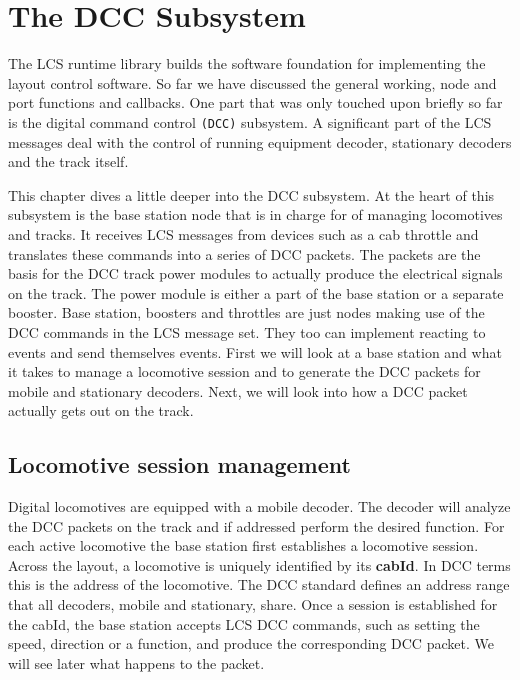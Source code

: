\chapter{The DCC Subsystem}

The LCS runtime library builds the software foundation for implementing the layout control software. So far we have discussed the general working, node and port functions and callbacks. One part that was only touched upon briefly so far is the digital command control \texttt{(DCC)} subsystem. A significant part of the LCS messages deal with the control of running equipment decoder, stationary decoders and the track itself.

This chapter dives a little deeper into the DCC subsystem. At the heart of this subsystem is the base station node that is in charge for of managing locomotives and tracks. It receives LCS messages from devices such as a cab throttle and translates these commands into a series of DCC packets. The packets are the basis for the DCC track power modules to actually produce the electrical signals on the track. The power module is either a part of the base station or a separate booster. Base station, boosters and throttles are just nodes making use of the DCC commands in the LCS message set. They too can implement reacting to events and send themselves events. First we will look at a base station and what it takes to manage a locomotive session and to generate the DCC packets for mobile and stationary decoders. Next, we will look into how a DCC packet actually gets out on the track.

\section{Locomotive session management}

Digital locomotives are equipped with a mobile decoder. The decoder will analyze the DCC packets on the track and if addressed perform the desired function. For each active locomotive the base station first establishes a locomotive session. Across the layout, a locomotive is uniquely identified by its \textbf{cabId}. In DCC terms this is the address of the locomotive. The DCC standard defines an address range that all decoders, mobile and stationary, share. Once a session is established for the cabId, the base station accepts LCS DCC commands, such as setting the speed, direction or a function, and produce the corresponding DCC packet. We will see later what happens to the packet.

